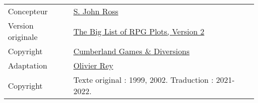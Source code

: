 


\vspace{0.2cm}

\begin{center}
\begin{tabular}{ll}
Concepteur        & \href{https://rolltop-indigo.blogspot.com/}{S. John Ross} \\
Version originale & \href{https://ghalev.itch.io/big-list-of-rpg-plots}{The Big List of RPG Plots, Version 2} \\
Copyright         & \href{https://ghalev.itch.io/}{Cumberland Games \& Diversions} \\
Adaptation        & \href{https://rouboudou.itch.io}{Olivier Rey} \\
Copyright         & Texte original : 1999, 2002. Traduction : 2021-2022. \\
\end{tabular}
\end{center}

\vspace{0.2cm}

